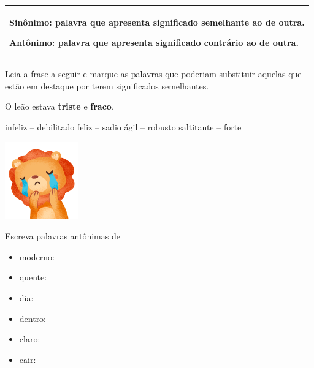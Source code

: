 
\begin{longtable}[]{@{}l@{}}
\toprule
\begin{minipage}[t]{0.97\columnwidth}\raggedright\strut
\textbf{Sinônimo}: palavra que apresenta significado semelhante ao de
outra.

\textbf{Antônimo}: palavra que apresenta significado contrário ao de
outra.
\strut
\end{minipage}\tabularnewline
\bottomrule
\end{longtable}

\begin{escolha}[itemsep=-5pt]
\item Leia a frase a seguir e marque as palavras que poderiam substituir aquelas que estão em destaque por terem significados semelhantes.

O leão estava \textbf{triste} e \textbf{fraco}.

\begin{minipage}{.4\textwidth}
\begin{boxlist}
 infeliz -- debilitado
 feliz -- sadio
 ágil -- robusto
 saltitante -- forte
\end{boxlist}
\end{minipage}
\begin{minipage}{.7\textwidth}
\includegraphics[width=.5\textwidth]{./media/image1c.png}
\end{minipage}

\pagebreak
\item Escreva palavras antônimas de

\begin{itemize}
\item
  moderno: 
\item
  quente: 
\item
  dia: 
\item
  dentro: 
\item
  claro: 
\item
  cair: 
\end{itemize}
\end{escolha}

